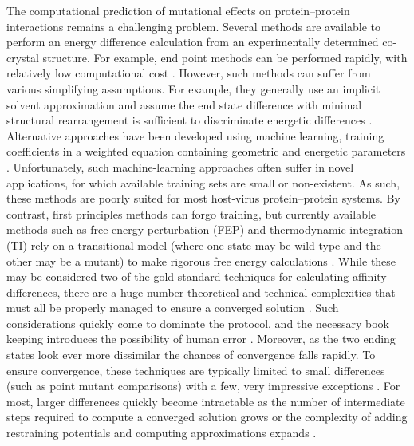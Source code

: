 \documentclass[12pt]{article}
\begin{document}
The computational prediction of mutational effects on protein--protein interactions remains a challenging problem. Several methods are available to perform an energy difference calculation from an experimentally determined co-crystal structure. For example, end point methods can be performed rapidly, with relatively low computational cost \citep{Grant2011,Kortemme2004}. However, such methods can suffer from various simplifying assumptions. For example, they generally use an implicit solvent approximation and assume the end state difference with minimal structural rearrangement is sufficient to discriminate energetic differences \citep{Grant2011,Kortemme2004}. Alternative approaches have been developed using machine learning, training coefficients in a weighted equation containing geometric and energetic parameters \citep{Vreven2011,Vreven2012,Bajaj2011,Hwang2010}. Unfortunately, such machine-learning approaches often suffer in novel applications, for which available training sets are small or non-existent. As such, these methods are poorly suited for most host-virus protein--protein systems. By contrast, first principles methods can forgo training, but currently available methods such as free energy perturbation (FEP) and thermodynamic integration (TI) rely on a transitional model (where one state may be wild-type and the other may be a mutant) to make rigorous free energy calculations  \citep{Gilson1997,Lu2004,Chodera2011,Gumbart2013}. While these may be considered two of the gold standard techniques for calculating affinity differences, there are a huge number theoretical and technical complexities that must all be properly managed to ensure a converged solution \citep{Gumbart2013b}. Such considerations quickly come to dominate the protocol, and the necessary book keeping introduces the possibility of human error \citep{Gumbart2013b}. Moreover, as the two ending states look ever more dissimilar the chances of convergence falls rapidly. To ensure convergence, these techniques are typically limited to small differences (such as point mutant comparisons) with a few, very impressive exceptions \citep{Wang2006,Gumbart2013,Gumbart2013b}. For most, larger differences quickly become intractable as the number of intermediate steps required to compute a converged solution grows or the complexity of adding restraining potentials and computing approximations expands \citep{Wang2006,Gumbart2013,Gumbart2013b}.
\end{document}
